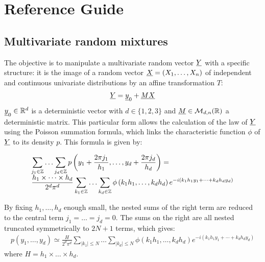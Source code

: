 



\section{Reference Guide}

\subsection{Multivariate random mixtures}

The objective is to manipulate a multivariate random vector ${\underline{Y}}$ with a specific structure:
it is the image of a random vector ${\underline{X}} = (X_1, \hdots, X_n) $ of independent and continuous univariate distributions by an affine transformation $T$:
\begin{align}\label{defY}
  {\underline{Y}}={\underline{y}}_0+{\underline{M}}{\underline{X}}
\end{align}
${\underline{y}}_0\in\mathbb{R}^d$ is a deterministic vector with $d\in\{1,2,3\}$ and ${\underline{M}}\in\mathcal{M}_{d,n}(\mathbb{R})$
a deterministic matrix. This particular form allows the calculation of the law of ${\underline{Y}} $ using the Poisson summation formula, which links the characteristic
function $\phi $ of ${\underline{Y}}$ to its density $p$. This formula is given by:

\begin{align}\label{poissonND}
  \begin{array}{p{\textwidth}}
    \multicolumn{1}{l}{\displaystyle\sum_{j_1\in\mathbb{Z}}\hdots\sum_{j_d\in\mathbb{Z}}p\left(y_1+\frac{2\pi j_1}{h_1},\hdots,y_d+\frac{2\pi j_d}{h_d}\right)= }\\
    \multicolumn{1}{r}{\displaystyle\frac{h_1\times\cdots\times h_d}{2^d\pi^d}\sum_{k_1\in\mathbb{Z}}\hdots\sum_{k_d\in\mathbb{Z}}\phi\left(k_1h_1,\hdots,k_dh_d\right)e^{-i(k_1h_1y_1+\cdots+k_dh_dy_d)}}
  \end{array}
\end{align}

By fixing $h_1,\hdots,h_d$ enough small, the nested sums of the right term are reduced to the central term $j_1=\hdots=j_d = 0$.
The sums on the right are all nested truncated symmetrically to $ 2N +1 $ terms, which gives:
\begin{align}
  p\left(y_1,\hdots,y_d\right)\simeq\frac{H}{2^d\pi^d}\sum_{|k_1|\leq N}\hdots\sum_{|k_d|\leq N}\phi\left(k_1h_1,\hdots,k_dh_d\right)e^{-i(k_1h_1y_1+\cdots+k_dh_dy_d)}
\end{align}
where $H = h_1\times\hdots\times h_d$.

